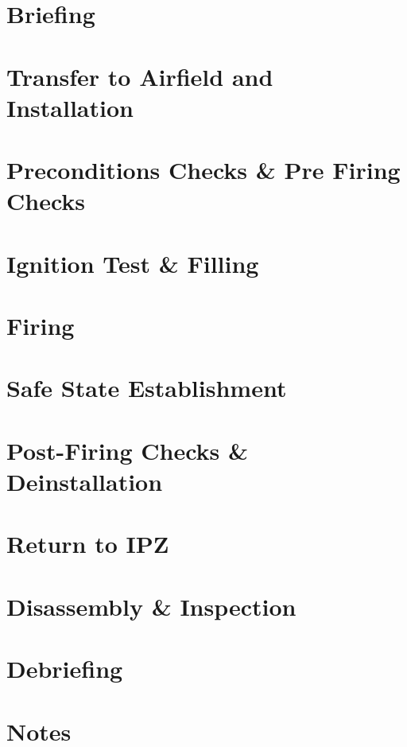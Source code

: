 \documentclass{article}
\begin{document}
\section{Briefing}


\section{Transfer to Airfield and Installation}


\section{Preconditions Checks \& Pre Firing Checks}


\section{Ignition Test \& Filling}


\section{Firing}


\section{Safe State Establishment}


\section{Post-Firing Checks \& Deinstallation}


\section{Return to IPZ}


\section{Disassembly \& Inspection}


\section{Debriefing}

\newpage

\setcounter{section}{0}
\section*{Notes}

\end{document}
